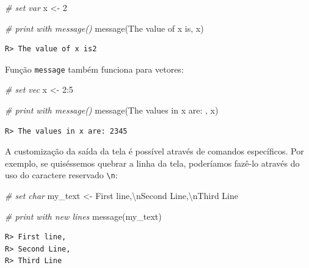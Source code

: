 \documentclass[
  11pt,
]{book}
\newenvironment{Shaded}{\begin{snugshade}}{\end{snugshade}}
\newcommand{\CommentTok}[1]{\textcolor[rgb]{0.37,0.37,0.37}{\textit{#1}}}
\newcommand{\DecValTok}[1]{\textcolor[rgb]{0.06,0.06,0.06}{#1}}
\newcommand{\FunctionTok}[1]{\textcolor[rgb]{0,0,0}{#1}}
\newcommand{\NormalTok}[1]{#1}
\newcommand{\OtherTok}[1]{\textcolor[rgb]{0.37,0.37,0.37}{#1}}
\newcommand{\SpecialCharTok}[1]{\textcolor[rgb]{0,0,0}{#1}}
\newcommand{\StringTok}[1]{\textcolor[rgb]{0.5,0.5,0.5}{#1}}
\begin{document}
\begin{Shaded}
\begin{Highlighting}[]
\CommentTok{\# set var}
\NormalTok{x }\OtherTok{\textless{}{-}} \DecValTok{2}

\CommentTok{\# print with message()}
\FunctionTok{message}\NormalTok{(}\StringTok{\textquotesingle{}The value of x is\textquotesingle{}}\NormalTok{, x)}
\end{Highlighting}
\end{Shaded}

\begin{verbatim}
R> The value of x is2
\end{verbatim}

Função \texttt{message} também funciona para vetores:

\begin{Shaded}
\begin{Highlighting}[]
\CommentTok{\# set vec}
\NormalTok{x }\OtherTok{\textless{}{-}} \DecValTok{2}\SpecialCharTok{:}\DecValTok{5}

\CommentTok{\# print with message()}
\FunctionTok{message}\NormalTok{(}\StringTok{\textquotesingle{}The values in x are: \textquotesingle{}}\NormalTok{, x)}
\end{Highlighting}
\end{Shaded}

\begin{verbatim}
R> The values in x are: 2345
\end{verbatim}

A customização da saída da tela é possível através de comandos específicos. Por exemplo, se quiséssemos quebrar a linha da tela, poderíamos fazê-lo através do uso do caractere reservado \texttt{\textbackslash{}n}:

\begin{Shaded}
\begin{Highlighting}[]
\CommentTok{\# set char}
\NormalTok{my\_text }\OtherTok{\textless{}{-}} \StringTok{\textquotesingle{}First line,}\SpecialCharTok{\textbackslash{}n}\StringTok{Second Line,}\SpecialCharTok{\textbackslash{}n}\StringTok{Third Line\textquotesingle{}}

\CommentTok{\# print with new lines}
\FunctionTok{message}\NormalTok{(my\_text)}
\end{Highlighting}
\end{Shaded}

\begin{verbatim}
R> First line,
R> Second Line,
R> Third Line
\end{verbatim}
\end{document}

